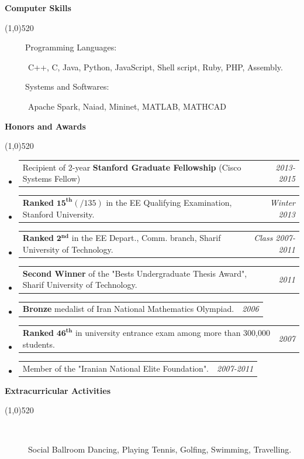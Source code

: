 \documentclass[letterpaper,10pt]{article}
\makeatletter
\newcommand{\heading}[1] {
  {\large
    \begin{minipage}
    {\textwidth}
    {\textbf{#1}}
    \end{minipage}
  }
  \begin{center}
  \vspace{-15pt}
  \line(1,0){520}
  \end{center}
}
\newcommand{\template}[2]{
\begin{tabular*}{7.0in}{l@{\extracolsep{\fill}}r}
		#1 & \textit{#2} \\
\end{tabular*}\vspace{-1pt}}
\makeatother
\begin{document}
\heading{Computer Skills}

\begin{description}

\item[~~~~~Programming Languages:]
C++, C, Java, Python, JavaScript, Shell script, Ruby, PHP, Assembly.

\item[~~~~~Systems and Softwares:]
Apache Spark, Naiad, Mininet, MATLAB, MATHCAD

\end{description}





\heading{Honors and Awards}

\begin{itemize}

\item  \template{Recipient of 2-year \textbf {Stanford Graduate Fellowship} (Cisco Systems Fellow)}{2013-2015}

\item  \template{\textbf{Ranked} $\mathbf{15^{th}}(/135)$ in the EE Qualifying Examination, Stanford University.}{Winter 2013}

\item  \template{\textbf{Ranked} $\mathbf{2^{nd}}$ in the EE Depart., Comm. branch, Sharif University of Technology.}{Class 2007-2011}

\item \template{ \textbf{Second Winner} of the "Bests Undergraduate Thesis Award", Sharif University of Technology.}{2011}

\item \template{\textbf{Bronze} medalist of Iran National Mathematics Olympiad.}{2006}

\item \template{\textbf{Ranked} $\mathbf{46^{th}}$ in university entrance exam among more than 300,000 students.}{2007}

\item \template{Member of the "Iranian National Elite Foundation".}{2007-2011} 

\end{itemize}





\heading{Extracurricular Activities}

\begin{description}

\item[~~~~~] Social Ballroom Dancing, Playing Tennis, Golfing, Swimming, Travelling.

\end{description}
\end{document}
